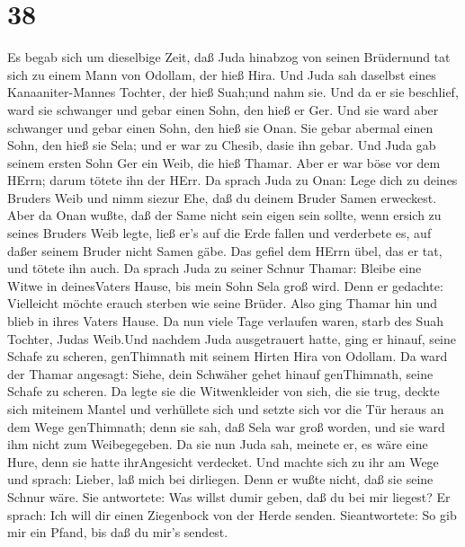 \hypertarget{section-37}{%
\section{38}\label{section-37}}

 Es begab sich um dieselbige Zeit, daß Juda hinabzog von
seinen Brüdernund tat sich zu einem Mann von Odollam, der hieß Hira.
 Und Juda sah daselbst eines Kanaaniter-Mannes Tochter, der
hieß Suah;und nahm sie. Und da er sie beschlief,  ward sie
schwanger und gebar einen Sohn, den hieß er Ger.  Und sie
ward aber schwanger und gebar einen Sohn, den hieß sie Onan.
 Sie gebar abermal einen Sohn, den hieß sie Sela; und er war
zu Chesib, dasie ihn gebar.  Und Juda gab seinem ersten Sohn
Ger ein Weib, die hieß Thamar.  Aber er war böse vor dem
HErrn; darum tötete ihn der HErr.  Da sprach Juda zu Onan:
Lege dich zu deines Bruders Weib und nimm siezur Ehe, daß du deinem
Bruder Samen erweckest.  Aber da Onan wußte, daß der Same
nicht sein eigen sein sollte, wenn ersich zu seines Bruders Weib legte,
ließ er's auf die Erde fallen und verderbete es, auf daßer seinem Bruder
nicht Samen gäbe.  Das gefiel dem HErrn übel, das er tat,
und tötete ihn auch.  Da sprach Juda zu seiner Schnur
Thamar: Bleibe eine Witwe in deinesVaters Hause, bis mein Sohn Sela groß
wird. Denn er gedachte: Vielleicht möchte erauch sterben wie seine
Brüder. Also ging Thamar hin und blieb in ihres Vaters Hause.
 Da nun viele Tage verlaufen waren, starb des Suah Tochter,
Judas Weib.Und nachdem Juda ausgetrauert hatte, ging er hinauf, seine
Schafe zu scheren, genThimnath mit seinem Hirten Hira von Odollam.
 Da ward der Thamar angesagt: Siehe, dein Schwäher gehet
hinauf genThimnath, seine Schafe zu scheren.  Da legte sie
die Witwenkleider von sich, die sie trug, deckte sich miteinem Mantel
und verhüllete sich und setzte sich vor die Tür heraus an dem Wege
genThimnath; denn sie sah, daß Sela war groß worden, und sie ward ihm
nicht zum Weibegegeben.  Da sie nun Juda sah, meinete er,
es wäre eine Hure, denn sie hatte ihrAngesicht verdecket. 
Und machte sich zu ihr am Wege und sprach: Lieber, laß mich bei
dirliegen. Denn er wußte nicht, daß sie seine Schnur wäre. Sie
antwortete: Was willst dumir geben, daß du bei mir liegest?
 Er sprach: Ich will dir einen Ziegenbock von der Herde
senden. Sieantwortete: So gib mir ein Pfand, bis daß du mir's sendest.
